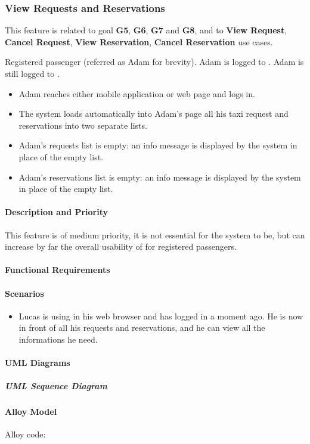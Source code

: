 \subsubsection{View Requests and Reservations}
This feature is related to goal \textbf{G5}, \textbf{G6}, \textbf{G7} and \textbf{G8}, and to \textbf{View Request}, \textbf{Cancel Request}, \textbf{View Reservation}, \textbf{Cancel Reservation} use cases.
\begin{itemize}
	 Registered passenger (referred as Adam for brevity).
	 Adam is logged to \myTaxiService{}.
	 Adam is still logged to \myTaxiService{}.
	\begin{itemize}
		\item Adam reaches either \myTaxiService{} mobile application or web page and logs in.
		\item The system loads automatically into Adam's page all his taxi request and reservations into two separate lists.
	\end{itemize}
	\begin{itemize}
		\item Adam's requests list is empty: an info message is displayed by the system in place of the empty list.
		\item Adam's reservations list is empty: an info message is displayed by the system in place of the empty list.
	\end{itemize}
\end{itemize}
\paragraph{Description and Priority}
This feature is of medium priority, it is not essential for the system to be, but can increase by far the overall usability of \myTaxiService{} for registered passengers.\par
\paragraph{Functional Requirements}
\begin{itemize}
\end{itemize}
\paragraph{Scenarios}
\begin{itemize}
	\item Lucas is using \myTaxiService{} in his web browser and has logged in a moment ago.
	He is now in front of all his requests and reservations, and he can view all the informations he need.
\end{itemize}
\paragraph{UML Diagrams}
\subparagraph{UML Sequence Diagram}
\paragraph{Alloy Model}
Alloy code: